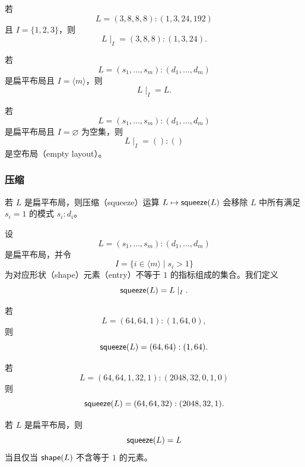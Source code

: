 
\begin{example}
    若
    \[L = (3,8,8,8):(1,3,24,192)\]
    且 $I = \{1,2,3\}$，则
    \[
    L\mid_I = (3,8,8):(1,3,24).
    \]
\end{example}

\begin{example}
    若
    \[L = (s_1,\dots,s_m):(d_1,\dots,d_m)\]
    是扁平布局且 $I = \langle m \rangle$，则
    \[
    L \mid_I = L.
    \]
\end{example}

\begin{example}
若
\[L = (s_1,\dots,s_m):(d_1,\dots,d_m)\]
是扁平布局且 $I = \varnothing$ 为空集，则
\[
L \mid_I = ():()
\]
是空布局（empty layout）。
\end{example}



\subsubsection{压缩}

若 $L$ 是扁平布局，则压缩（squeeze）运算 $L \mapsto \mathsf{squeeze}(L)$ 会移除 $L$ 中所有满足 $s_i = 1$ 的模式 $s_i:d_i$。

\begin{construction}\label{Constructionofsqueeze}
    设
    \[L = (s_1,\dots,s_m):(d_1,\dots,d_m)\]
    是扁平布局，并令
    \[
    I = \{ i \in \langle m \rangle \mid s_i > 1\}
    \]
    为对应形状（shape）元素（entry）不等于 $1$ 的指标组成的集合。我们定义
    \[
    \mathsf{squeeze}(L) = L \mid_I.
    \]
\end{construction}

\begin{example}
    若
    \[L = (64,64,1):(1,64,0),\]
    则
    \[
    \mathsf{squeeze}(L) = (64,64):(1,64).
    \]
\end{example}

\begin{example}
    若
    \[
    L = (64,64,1,32,1):(2048,32,0,1,0)
    \]
    则
    \[
    \mathsf{squeeze}(L) = (64,64,32):(2048,32,1).
    \]
\end{example}


\begin{example}
    若 $L$ 是扁平布局，则
    \[
    \mathsf{squeeze}(L) = L
    \]
    当且仅当 $\mathsf{shape}(L)$ 不含等于 $1$ 的元素。
\end{example}

